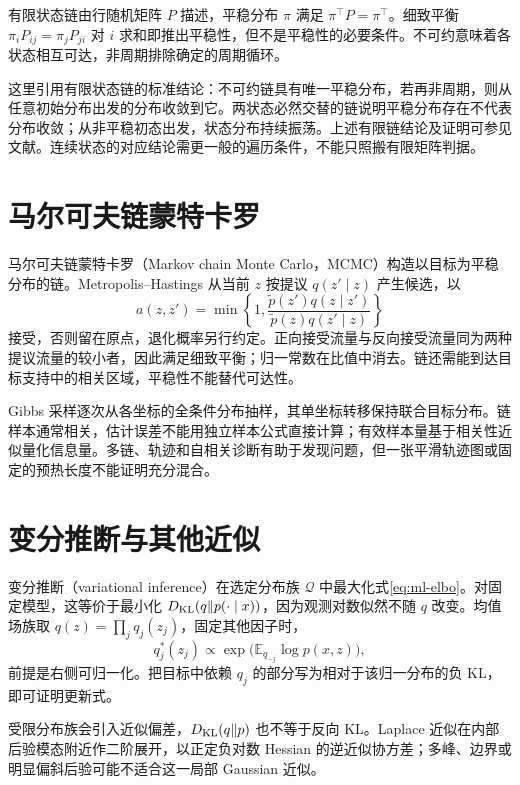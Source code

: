 有限状态链由行随机矩阵 $P$ 描述，平稳分布 $\pi$ 满足 $\pi^\top P=\pi^\top$。细致平衡 $\pi_iP_{ij}=\pi_jP_{ji}$ 对 $i$ 求和即推出平稳性，但不是平稳性的必要条件。不可约意味着各状态相互可达，非周期排除确定的周期循环。

这里引用有限状态链的标准结论：不可约链具有唯一平稳分布，若再非周期，则从任意初始分布出发的分布收敛到它。两状态必然交替的链说明平稳分布存在不代表分布收敛；从非平稳初态出发，状态分布持续振荡。上述有限链结论及证明可参见文献\cite[第1、4章]{ml-markov}。连续状态的对应结论需更一般的遍历条件，不能只照搬有限矩阵判据。

\section{马尔可夫链蒙特卡罗}

马尔可夫链蒙特卡罗（Markov chain Monte Carlo，MCMC）构造以目标为平稳分布的链。Metropolis--Hastings 从当前 $z$ 按提议 $q(z'\mid z)$ 产生候选，以
\begin{equation}
 a(z,z')=\min\left\{1,\frac{\widetilde p(z')q(z\mid z')}
 {\widetilde p(z)q(z'\mid z)}\right\}
 \label{eq:ml-mh-acceptance}
\end{equation}
接受，否则留在原点，退化概率另行约定。正向接受流量与反向接受流量同为两种提议流量的较小者，因此满足细致平衡；归一常数在比值中消去。链还需能到达目标支持中的相关区域，平稳性不能替代可达性。

Gibbs 采样逐次从各坐标的全条件分布抽样，其单坐标转移保持联合目标分布。链样本通常相关，估计误差不能用独立样本公式直接计算；有效样本量基于相关性近似量化信息量。多链、轨迹和自相关诊断有助于发现问题，但一张平滑轨迹图或固定的预热长度不能证明充分混合。

\section{变分推断与其他近似}

变分推断（variational inference）在选定分布族 $\mathcal Q$ 中最大化式\eqref{eq:ml-elbo}。对固定模型，这等价于最小化 $D_{\rm KL}(q\Vert p(\cdot\mid x))$，因为观测对数似然不随 $q$ 改变。均值场族取 $q(z)=\prod_jq_j(z_j)$，固定其他因子时，
\begin{equation}
 q_j^*(z_j)\propto
 \exp\bigl(\mathbb E_{q_{-j}}\log p(x,z)\bigr),
 \label{eq:ml-mean-field}
\end{equation}
前提是右侧可归一化。把目标中依赖 $q_j$ 的部分写为相对于该归一分布的负 KL，即可证明更新式。

受限分布族会引入近似偏差，$D_{\rm KL}(q\Vert p)$ 也不等于反向 KL。Laplace 近似在内部后验模态附近作二阶展开，以正定负对数 Hessian 的逆近似协方差；多峰、边界或明显偏斜后验可能不适合这一局部 Gaussian 近似。

